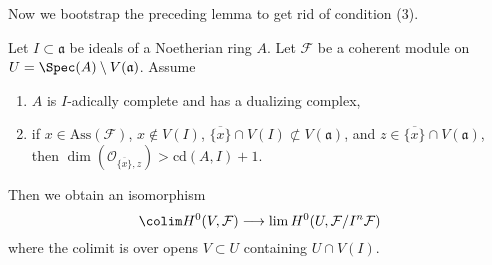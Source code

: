 \noindent
Now we bootstrap the preceding lemma to get rid of condition (3).

\begin{proposition}
\label{proposition-application-H0}
Let $I \subset \mathfrak a$ be ideals of a Noetherian ring $A$.
Let $\mathcal{F}$ be a coherent module on
$U = \Spec(A) \setminus V(\mathfrak a)$.
Assume
\begin{enumerate}
\item $A$ is $I$-adically complete and has a dualizing complex,
\item if $x \in \text{Ass}(\mathcal{F})$, $x \not \in V(I)$,
$\overline{\{x\}} \cap V(I) \not \subset V(\mathfrak a)$,
and $z \in \overline{\{x\}} \cap V(\mathfrak a)$, then
$\dim(\mathcal{O}_{\overline{\{x\}}, z}) > \text{cd}(A, I) + 1$.
\end{enumerate}
Then we obtain an isomorphism
$$
\colim H^0(V, \mathcal{F})
\longrightarrow
\lim H^0(U, \mathcal{F}/I^n\mathcal{F})
$$
where the colimit is over opens $V \subset U$ containing $U \cap V(I)$.
\end{proposition}

